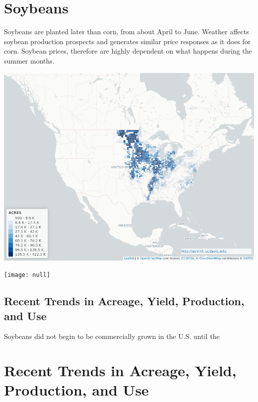 \documentclass[
]{book}
\begin{document}
\hypertarget{soybeans}{%
\section{Soybeans}\label{soybeans}}

Soybeans are planted later than corn, from about April to June. Weather affects soybean production prospects and generates similar price responses as it does for corn. Soybean prices, therefore are highly dependent on what happens during the summer months.

\href{https://asmith.ucdavis.edu/data/us-crops}{\includegraphics{assets/map_SOYBEANS_AREA PLANTED.png}}

\texttt{[image: null]}

\hfill\break

\hypertarget{recent-trends-in-acreage-yield-production-and-use}{%
\subsection{Recent Trends in Acreage, Yield, Production, and Use}\label{recent-trends-in-acreage-yield-production-and-use}}

Soybeans did not begin to be commercially grown in the U.S. until the

\hypertarget{recent-trends-in-acreage-yield-production-and-use-1}{%
\section{Recent Trends in Acreage, Yield, Production, and Use}\label{recent-trends-in-acreage-yield-production-and-use-1}}
\end{document}
